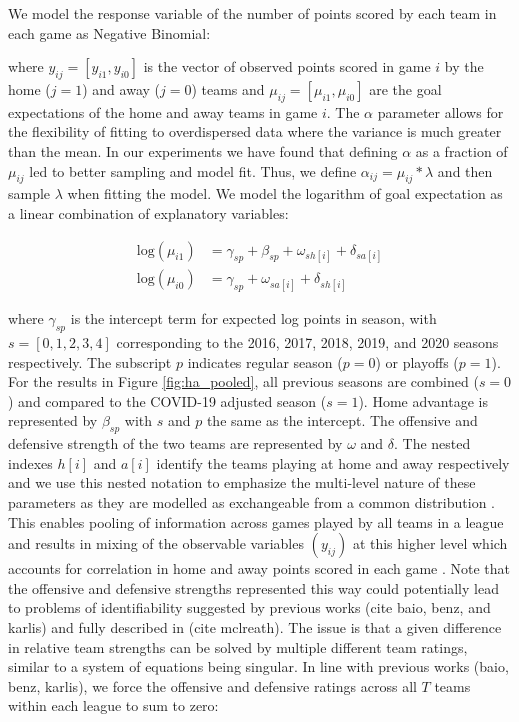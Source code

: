 We model the response variable of the number of points scored by each team in each game as Negative Binomial:

where \(y_{ij} = [y_{i1}, y_{i0}]\) is the vector of observed points scored in game \(i\) by the home (\(j=1\)) and away (\(j=0\)) teams and \(\mu_{ij} = [\mu_{i1}, \mu_{i0}]\) are the goal expectations of the home and away teams in game \(i\). The \(\alpha\) parameter allows for the flexibility of fitting to overdispersed data where the variance is much greater than the mean. In our experiments we have found that defining \(\alpha\) as a fraction of \(\mu_{ij}\) led to better sampling and model fit. Thus, we define \(\alpha_{ij} = \mu_{ij} * \lambda\) and then sample \(\lambda\) when fitting the model. We model the logarithm of goal expectation as a linear combination of explanatory variables:

\begin{equation} \label{eq:expected points}
\begin{split}
\text{log}(\mu_{i1}) &= \gamma_{sp} + \beta_{sp} + \omega_{sh[i]} + \delta_{sa[i]} \\
\text{log}(\mu_{i0}) &= \gamma_{sp} + \omega_{sa[i]} + \delta_{sh[i]}
\end{split}
\end{equation}

where \(\gamma_{sp}\) is the intercept term for expected log points in season, with \(s = [0, 1, 2, 3, 4]\) corresponding to the 2016, 2017, 2018, 2019, and 2020 seasons respectively. The subscript \(p\) indicates regular season (\(p=0\)) or playoffs (\(p=1\)). For the results in Figure \ref{fig:ha_pooled}, all previous seasons are combined (\(s=0\)) and compared to the COVID-19 adjusted season (\(s=1\)). Home advantage is represented by \(\beta_{sp}\) with \(s\) and \(p\) the same as the intercept. The offensive and defensive strength of the two teams are represented by \(\omega\) and \(\delta\). The nested indexes \(h[i]\) and \(a[i]\) identify the teams playing at home and away respectively and we use this nested notation to emphasize the multi-level nature of these parameters as they are modelled as exchangeable from a common distribution \cite{McElreath2020} \cite{Gelman2014} \cite{Gelman2006}. This enables pooling of information across games played by all teams in a league and results in mixing of the observable variables \((y_{ij})\) at this higher level which accounts for correlation in home and away points scored in each game \cite{Baio2010}. Note that the offensive and defensive strengths represented this way could potentially lead to problems of identifiability suggested by previous works (cite baio, benz, and karlis) and fully described in (cite mclreath). The issue is that a given difference in relative team strengths can be solved by multiple different team ratings, similar to a system of equations being singular. In line with previous works (baio, benz, karlis), we force the offensive and defensive ratings across all $T$ teams within each league to sum to zero:


